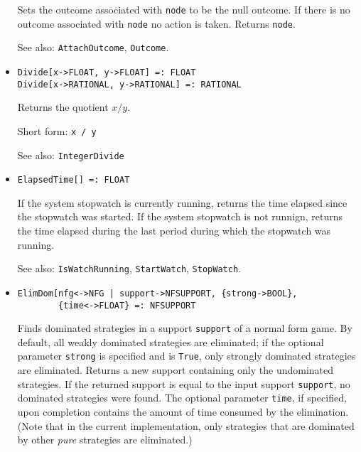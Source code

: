 \begin{itemize}
\bd
Sets the outcome associated with \verb+node+ to be the
null outcome.  If there is no outcome associated with \verb+node+ no
action is taken.  Returns \verb+node+.
\item
[See also:] {\tt AttachOutcome}, {\tt Outcome}.
\ed

\item 
\protect \large \begin{verbatim}
Divide[x->FLOAT, y->FLOAT] =: FLOAT
Divide[x->RATIONAL, y->RATIONAL] =: RATIONAL
\end{verbatim} \normalsize

\bd
Returns the quotient $x / y$. 
\item
[Short form:] \verb+x / y+
\item
[See also:] {\tt IntegerDivide}
\ed


\item
\protect \large \begin{verbatim}
ElapsedTime[] =: FLOAT
\end{verbatim}\normalsize

\bd
If the system stopwatch is currently running, returns the
time elapsed since the stopwatch was started.  If the system stopwatch
is not runnign, returns the time elapsed during the last period during which
the stopwatch was running.
\item
[See also:] {\tt IsWatchRunning}, {\tt StartWatch}, {\tt StopWatch}.
\ed

%

\item
\protect \large \begin{verbatim}
ElimDom[nfg<->NFG | support->NFSUPPORT, {strong->BOOL}, 
        {time<->FLOAT} =: NFSUPPORT
\end{verbatim} \normalsize

\bd
Finds dominated strategies in a support \verb+support+ of a normal
form game.  By default, all weakly dominated strategies are eliminated;
if the optional parameter \verb+strong+ is specified and is \verb+True+,
only strongly dominated strategies are eliminated.  Returns a new support
containing only the undominated strategies.  If the returned support
is equal to the input support \verb+support+, no dominated strategies were
found.  The optional parameter \verb+time+, if specified, upon completion
contains the amount of time consumed by the elimination.  (Note that in
the current implementation, only strategies that are dominated by
other {\em pure} strategies are eliminated.)  
\ed


\end{itemize}
